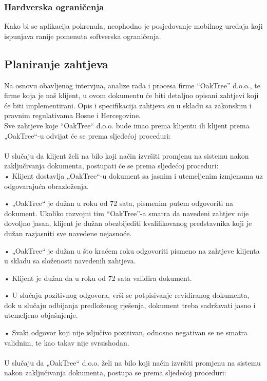 \documentclass[12pt]{article}
\begin{document}
\subsubsection{Hardverska ograničenja}

Kako bi se aplikacija pokrenula, neophodno je posjedovanje mobilnog uređaja koji ispunjava ranije pomenuta softverska ograničenja.

\subsection{Planiranje zahtjeva}

Na osnovu obavljenog intervjua, analize rada i procesa firme “OakTree” d.o.o., te firme koja je naš klijent, u ovom dokumentu će biti detaljno opisani zahtjevi koji će biti implementirani. Opis i specifikacija zahtjeva su u skladu sa zakonskim i pravnim regulativama Bosne i Hercegovine.\\
Sve zahtjeve koje “OakTree“ d.o.o. bude imao prema klijentu ili klijent prema „OakTree“-u odvijat će se prema sljedećoj proceduri: \\ \\ U slučaju da klijent želi na bilo koji način izvršiti promjenu na sistemu nakon zaključivanja dokumenta, postupati će se prema sljedećoj proceduri: \\

•	Klijent dostavlja „OakTree“-u dokument sa jasnim i utemeljenim izmjenama uz odgovarajuća obrazloženja.  
 
•	„OakTree“ je dužan u roku od 72 sata, pismenim putem odgovoriti na dokument.  Ukoliko razvojni tim “OakTree”-a smatra da navedeni zahtjev nije dovoljno jasan, klijent je dužan obezbijediti kvalifikovanog predstavnika koji je dužan razjasniti sve navedene nejasnoće.  

•	„OakTree“ je dužan u što kraćem roku odgovoriti pismeno na zahtjeve klijenta u skladu sa složenosti navedenih zahtjeva.

•	Klijent je dužan da u roku od 72 sata validira dokument.
  
•	U slučaju pozitivnog odgovora, vrši se potpisivanje revidiranog dokumenta, dok u slučaju odbijanja predloženog rješenja, dokument treba sadržavati jasno i utemeljeno objašnjenje.  
 
•	Svaki odgovor koji nije isljučivo pozitivan, odnosno negativan se ne smatra validnim, te kao takav nije svrsishodan. \\ \\
U slučaju da „OakTree“ d.o.o. želi na bilo koji način izvršiti promjenu na sistemu nakon zaključivanja dokumenta, postupa se prema sljedećoj proceduri:\\
\end{document}
